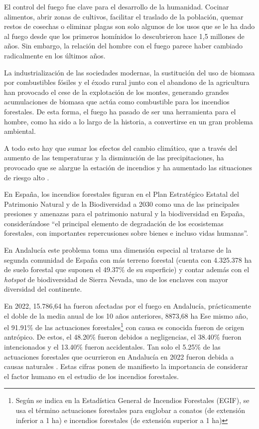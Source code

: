 \documentclass[12pt,a4paper,]{book}
\let\rmarkdownfootnote\footnote%
\def\footnote{\protect\rmarkdownfootnote}
\numberwithin{dummy}{section}
\theoremstyle{ocrenumbox}
\theoremstyle{blacknumex}
\theoremstyle{blacknumbox}
\theoremstyle{ocrenum}
\theoremstyle{ocrenum}
\begin{document}
El control del fuego fue clave para el desarrollo de la humanidad.
Cocinar alimentos, abrir zonas de cultivos, facilitar el traslado de la
población, quemar restos de cosechas o eliminar plagas son solo algunos
de los usos que se le ha dado al fuego desde que los primeros homínidos
lo descubrieron hace 1,5 millones de años. Sin embargo, la relación del
hombre con el fuego parece haber cambiado radicalmente en los últimos
años.

La industrialización de las sociedades modernas, la sustitución del uso
de biomasa por combustibles fósiles y el éxodo rural junto con el
abandono de la agricultura han provocado el cese de la explotación de
los montes, generando grandes acumulaciones de biomasa que actúa como
combustible para los incendios forestales. De esta forma, el fuego ha
pasado de ser una herramienta para el hombre, como ha sido a lo largo de
la historia, a convertirse en un gran problema ambiental.

A todo esto hay que sumar los efectos del cambio climático, que a través
del aumento de las temperaturas y la disminución de las precipitaciones,
ha provocado que se alargue la estación de incendios y ha aumentado las
situaciones de riesgo alto \citep{incendioCamCLim}.

En España, los incendios forestales figuran en el Plan Estratégico
Estatal del Patrimonio Natural y de la Biodiversidad a 2030 como una de
las principales presiones y amenazas para el patrimonio natural y la
biodiversidad en España, considerándose ``el principal elemento de
degradación de los ecosistemas forestales, con importantes repercusiones
sobre bienes e incluso vidas humanas''.

En Andalucía este problema toma una dimensión especial al tratarse de la
segunda comunidad de España con más terreno forestal (cuenta con
4.325.378 ha de suelo forestal que suponen el 49.37\% de su superficie)
y contar además con el \emph{hotspot} de biodiversidad de Sierra Nevada,
uno de los enclaves con mayor diversidad del continente.

En 2022, 15.786,64 ha fueron afectadas por el fuego en Andalucía,
prácticamente el doble de la media anual de los 10 años anteriores,
8873,68 ha Ese mismo año, el 91.91\% de las actuaciones
forestales\footnote{Según se indica en la Estadística General de
  Incendios Forestales (EGIF), se usa el término actuaciones forestales
  para englobar a conatos (de extensión inferior a 1 ha) e incendios
  forestales (de extensión superior a 1 ha)} con causa es conocida
fueron de origen antrópico. De estos, el 48.20\% fueron debidos a
negligencias, el 38.40\% fueron intencionados y el 13.40\% fueron
accidentales. Tan solo el 5.25\% de las actuaciones forestales que
ocurrieron en Andalucía en 2022 fueron debida a causas naturales
\citep{INFOCA2022}. Estas cifras ponen de manifiesto la importancia de
considerar el factor humano en el estudio de los incendios forestales.
\end{document}
